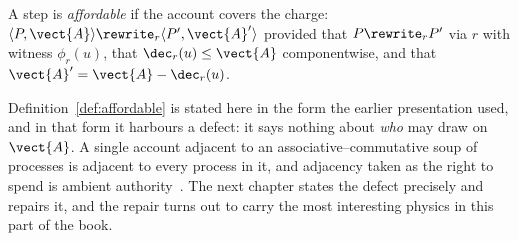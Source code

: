\begin{definition}
\label{def:affordable}
A step is \emph{affordable} if the account covers the charge:
$\langle P, \vect{A}\rangle \rewrite_r \langle P', \vect{A}'\rangle$
provided that $P \rewrite_r P'$ via $r$ with witness $\phi_r(u)$, that
$\dec_r(u) \leq \vect{A}$ componentwise, and that
$\vect{A}' = \vect{A} - \dec_r(u)$.
\end{definition}

Definition~\ref{def:affordable} is stated here in the form the earlier
presentation used, and in that form it harbours a defect: it says nothing
about \emph{who} may draw on $\vect{A}$.  A single account adjacent to an
associative--commutative soup of processes is adjacent to every process in
it, and adjacency taken as the right to spend is ambient
authority~\cite{finrho}.  The next chapter states the defect precisely and
repairs it, and the repair turns out to carry the most interesting physics
in this part of the book.


